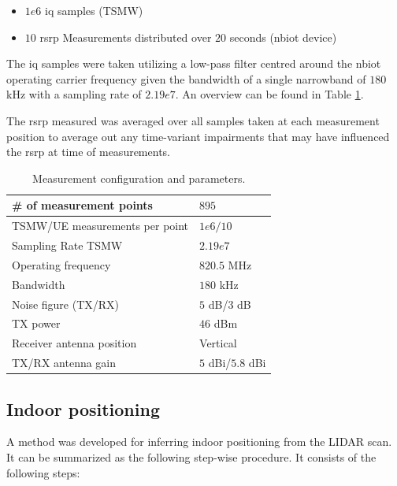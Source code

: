 \begin{itemize}
    \item $1e6$ \gls{iq} samples (TSMW)
    \item $10$ \gls{rsrp} Measurements distributed over $20$ seconds (\gls{nbiot} device)
\end{itemize}


The \gls{iq} samples were taken utilizing a low-pass filter centred around the \gls{nbiot} operating carrier frequency given the bandwidth of a single narrowband of $180$ kHz with a sampling rate of $2.19e7$. An overview can be found in Table \ref{tab:measurement_configuration}. 

The \gls{rsrp} measured was averaged over all samples taken at each measurement position to average out any time-variant impairments that may have influenced the \gls{rsrp} at time of measurements. 

\begin{table}[htbp]
    \centering
    \footnotesize{
    \begin{tabular}{@{}l|l@{}}
    \toprule
    \# of measurement points       & $895$             \\ \midrule
    TSMW/UE measurements per point & $1e6/10$          \\ \midrule
    Sampling Rate TSMW             & $2.19e7$          \\ \midrule
    Operating frequency            & $820.5$ MHz       \\ \midrule
    Bandwidth                      & $180$ kHz         \\ \midrule
    Noise figure (TX/RX)           & $5$ dB/$3$ dB     \\ \midrule
    TX power                       & $46$ dBm          \\ \midrule
    Receiver antenna position      & Vertical          \\ \midrule
    TX/RX antenna gain             & $5$ dBi/$5.8$ dBi \\ \bottomrule
    \end{tabular}
    \caption{Measurement configuration and parameters.}\label{tab:measurement_configuration}
    }
\end{table}

\subsection{Indoor positioning}
A method was developed for inferring indoor positioning from the LIDAR scan. It can be summarized as the following step-wise procedure. It consists of the following steps:


